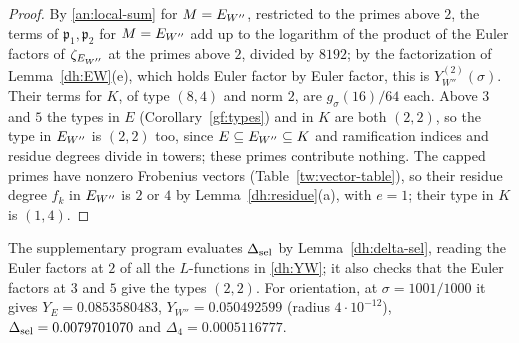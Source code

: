 \begin{proof}
By \eqref{an:local-sum} for $M=E_{W''}$, restricted to the primes above $2$, the
terms of $\mathfrak p_1,\mathfrak p_2$ for $M=E_{W''}$ add up to the logarithm
of the product of the Euler factors of $\zeta_{E_{W''}}$ at the primes above $2$,
divided by $8192$; by the factorization of Lemma~\ref{dh:EW}(e), which holds
Euler factor by Euler factor, this is $Y^{(2)}_{W''}(\sigma)$. Their terms for
$K$, of type $(8,4)$ and norm $2$, are $g_\sigma(16)/64$ each. Above $3$ and
$5$ the types in $E$ (Corollary~\ref{gf:types}) and in $K$ are both $(2,2)$,
so the type in $E_{W''}$ is $(2,2)$ too, since $E\subseteq E_{W''}\subseteq K$ and
ramification indices and residue degrees divide in towers; these primes
contribute nothing. The capped primes have nonzero Frobenius vectors
(Table~\ref{tw:vector-table}), so their residue degree $f_k$ in $E_{W''}$ is $2$
or $4$ by Lemma~\ref{dh:residue}(a), with $e=1$; their type in $K$ is
$(1,4)$.
\end{proof}

The supplementary program  evaluates
$\Delta_{\rm sel}$ by Lemma~\ref{dh:delta-sel}, reading the Euler factors at
$2$ of all the $L$-functions in \eqref{dh:YW}; it also checks that the Euler
factors at $3$ and $5$ give the types $(2,2)$. For orientation, at
$\sigma=1001/1000$ it gives $Y_E=0.0853580483$, $Y_{W''}=0.050492599$ (radius
$4\cdot10^{-12}$), $\Delta_{\rm sel}=0.0079701070$ and
$\Delta_4=0.0005116777$.
